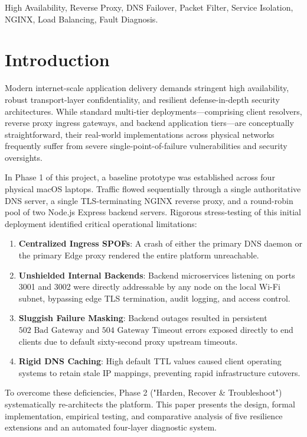 \documentclass[conference]{IEEEtran}
\begin{document}
\begin{IEEEkeywords}
High Availability, Reverse Proxy, DNS Failover, Packet Filter, Service Isolation, NGINX, Load Balancing, Fault Diagnosis.
\end{IEEEkeywords}

\section{Introduction}
Modern internet-scale application delivery demands stringent high availability, robust transport-layer confidentiality, and resilient defense-in-depth security architectures. While standard multi-tier deployments—comprising client resolvers, reverse proxy ingress gateways, and backend application tiers—are conceptually straightforward, their real-world implementations across physical networks frequently suffer from severe single-point-of-failure vulnerabilities and security oversights.

In Phase 1 of this project, a baseline prototype was established across four physical macOS laptops. Traffic flowed sequentially through a single authoritative DNS server, a single TLS-terminating NGINX reverse proxy, and a round-robin pool of two Node.js Express backend servers. Rigorous stress-testing of this initial deployment identified critical operational limitations:
\begin{enumerate}
    \item \textbf{Centralized Ingress SPOFs}: A crash of either the primary DNS daemon or the primary Edge proxy rendered the entire platform unreachable.
    \item \textbf{Unshielded Internal Backends}: Backend microservices listening on ports 3001 and 3002 were directly addressable by any node on the local Wi-Fi subnet, bypassing edge TLS termination, audit logging, and access control.
    \item \textbf{Sluggish Failure Masking}: Backend outages resulted in persistent $502\text{ Bad Gateway}$ and $504\text{ Gateway Timeout}$ errors exposed directly to end clients due to default sixty-second proxy upstream timeouts.
    \item \textbf{Rigid DNS Caching}: High default TTL values caused client operating systems to retain stale IP mappings, preventing rapid infrastructure cutovers.
\end{enumerate}

To overcome these deficiencies, Phase 2 ("Harden, Recover \& Troubleshoot") systematically re-architects the platform. This paper presents the design, formal implementation, empirical testing, and comparative analysis of five resilience extensions and an automated four-layer diagnostic system.
\end{document}
